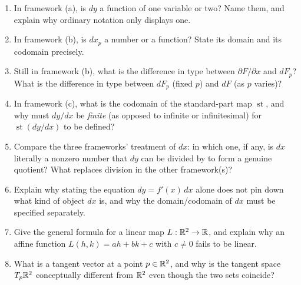 \documentclass{essay}
\begin{document}
\begin{enumerate}[leftmargin=*, itemsep=4pt]
  \item In framework (a), is \(dy\) a function of one variable or two? Name them, and explain why ordinary notation only displays one.
  \item In framework (b), is \(dx_{p}\) a number or a function? State its domain and its codomain precisely.
  \item Still in framework (b), what is the difference in type between \(\partial F/\partial x\) and \(dF_{p}\)? What is the difference in type between \(dF_{p}\) (fixed \(p\)) and \(dF\) (as \(p\) varies)?
  \item In framework (c), what is the codomain of the standard-part map \(\operatorname{st}\), and why must \(dy/dx\) be \emph{finite} (as opposed to infinite or infinitesimal) for \(\operatorname{st}(dy/dx)\) to be defined?
  \item Compare the three frameworks' treatment of \(dx\): in which one, if any, is \(dx\) literally a nonzero number that \(dy\) can be divided by to form a genuine quotient? What replaces division in the other framework(s)?
  \item Explain why stating the equation \(dy = f'(x)\,dx\) alone does not pin down what kind of object \(dx\) is, and why the domain/codomain of \(dx\) must be specified separately.
  \item Give the general formula for a linear map \(L : \mathbb{R}^{2} \to \mathbb{R}\), and explain why an affine function \(L(h,k) = ah+bk+c\) with \(c \ne 0\) fails to be linear.
  \item What is a tangent vector at a point \(p \in \mathbb{R}^{2}\), and why is the tangent space \(T_{p}\mathbb{R}^{2}\) conceptually different from \(\mathbb{R}^{2}\) even though the two sets coincide?
\end{enumerate}
\end{document}
